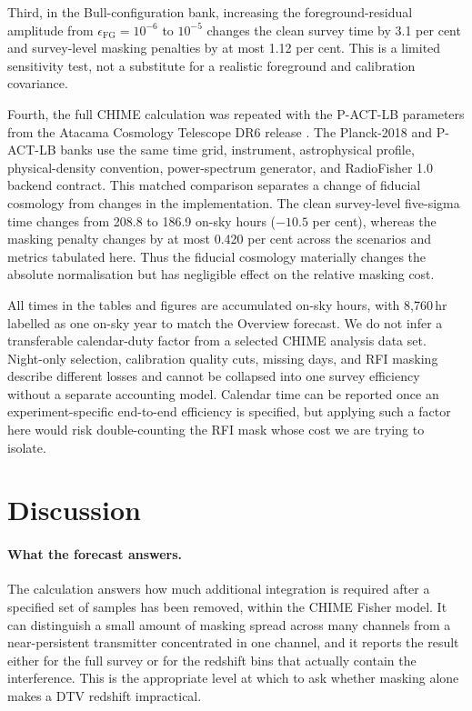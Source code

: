 Third, in the Bull-configuration bank, increasing the
foreground-residual amplitude from $\epsilon_\mathrm{FG}=10^{-6}$ to
$10^{-5}$ changes the clean survey time by 3.1 per cent and
survey-level masking penalties by at most 1.12 per cent. This is a limited
sensitivity test, not a substitute for a realistic foreground and
calibration covariance.

Fourth, the full CHIME calculation was repeated with the P-ACT-LB
parameters from the Atacama Cosmology Telescope DR6 release
\citep{ACTDR6}. The Planck-2018 and P-ACT-LB banks use the same time grid,
instrument, astrophysical profile, physical-density convention,
power-spectrum generator, and RadioFisher 1.0 backend contract. This matched
comparison separates a change of fiducial cosmology from changes in the
implementation. The clean survey-level five-sigma time changes from
208.8 to 186.9 on-sky hours ($-10.5$ per cent), whereas the masking
penalty changes by at most 0.420 per cent across the scenarios and metrics
tabulated here. Thus the fiducial cosmology materially changes the absolute
normalisation but has negligible effect on the relative masking cost.

All times in the tables and figures are accumulated on-sky hours, with
8,760\,hr labelled as one on-sky year to match the Overview forecast.
We do not infer a transferable calendar-duty factor from a selected
CHIME analysis data set. Night-only selection, calibration quality
cuts, missing days, and RFI masking describe different losses and
cannot be collapsed into one survey efficiency without a separate
accounting model. Calendar time can be reported once an
experiment-specific end-to-end efficiency is specified, but applying
such a factor here would risk double-counting the RFI mask whose cost
we are trying to isolate.

\section{Discussion}
\label{sec:discussion}

\paragraph{What the forecast answers.}
The calculation answers how much additional integration is required
after a specified set of samples has been removed, within the CHIME
Fisher model. It can distinguish a small amount of masking spread
across many channels from a near-persistent transmitter concentrated in
one channel, and it reports the result either for the full survey or
for the redshift bins that actually contain the interference. This is
the appropriate level at which to ask whether masking alone makes a DTV
redshift impractical.

